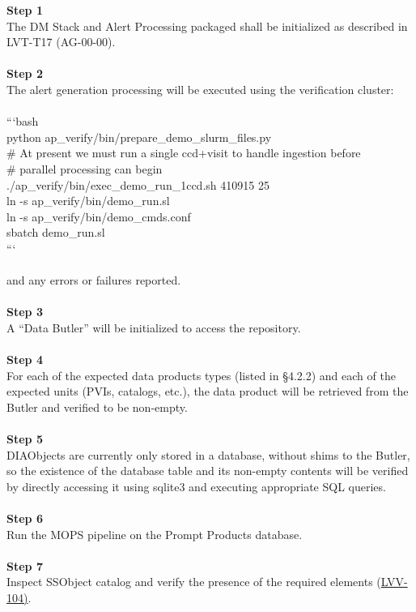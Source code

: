 \textbf{Step 1}\\
The DM Stack and Alert Processing packaged shall be initialized as
described in LVT-T17 (AG-00-00).\\
~\\
\textbf{Step 2}\\
The alert generation processing will be executed using the verification
cluster:\\
~\\
```bash\\
python ap\_verify/bin/prepare\_demo\_slurm\_files.py\\
\# At present we must run a single ccd+visit to handle ingestion
before\\
\# parallel processing can begin\\
./ap\_verify/bin/exec\_demo\_run\_1ccd.sh 410915 25\\
ln -s ap\_verify/bin/demo\_run.sl\\
ln -s ap\_verify/bin/demo\_cmds.conf\\
sbatch demo\_run.sl\\
```\\
~\\
and any errors or failures reported.\\
~\\
\textbf{Step 3}\\
A ``Data Butler'' will be initialized to access the repository.\\
~\\
\textbf{Step 4}\\
For each of the expected data products types (listed in §4.2.2) and each
of the expected units (PVIs, catalogs, etc.), the data product will be
retrieved from the Butler and verified to be non-empty.\\
~\\
\textbf{Step 5}\\
DIAObjects are currently only stored in a database, without shims to the
Butler, so the existence of the database table and its non-empty
contents will be verified by directly accessing it using sqlite3 and
executing appropriate SQL queries.\\
~\\
\textbf{Step 6}\\
Run the MOPS pipeline on the Prompt Products database.\\
~\\
\textbf{Step 7}\\
Inspect SSObject catalog and verify the presence of the required
elements
(​\href{https://jira.lsstcorp.org/browse/LVV-104}{LVV-104)}​​​.\\
~\\

